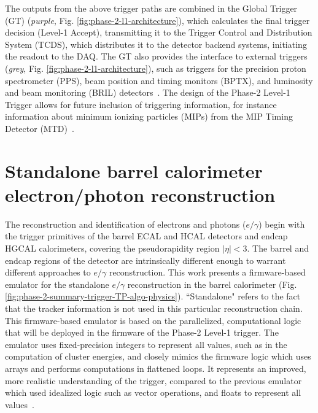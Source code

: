 The outputs from the above trigger paths are combined in the Global Trigger (GT) (\textit{purple}, Fig. \ref{fig:phase-2-l1-architecture}), which calculates the final trigger decision (Level-1 Accept), transmitting it to the Trigger Control and Distribution System (TCDS), which distributes it to the detector backend systems, initiating the readout to the DAQ. The GT also provides the interface to external triggers (\textit{grey}, Fig. \ref{fig:phase-2-l1-architecture}), such as triggers for the precision proton spectrometer (PPS), beam position and timing monitors (BPTX), and luminosity and beam monitoring (BRIL) detectors~\cite{CMS-TDR-021}. The design of the Phase-2 Level-1 Trigger allows for future inclusion of triggering information, for instance information about minimum ionizing particles (MIPs) from the MIP Timing Detector (MTD)~\cite{CERN-LHCC-2017-027}.

\section{Standalone barrel calorimeter electron/photon reconstruction}
\label{section:standalone_barrel_calo_egamma}
The reconstruction and identification of electrons and photons ($e/\gamma$) begin with the trigger primitives of the barrel ECAL and HCAL detectors and endcap HGCAL calorimeters, covering the pseudorapidity region $|\eta| < 3$. The barrel and endcap regions of the detector are intrinsically different enough to warrant different approaches to $e/\gamma$ reconstruction. This work presents a firmware-based emulator for the standalone $e/\gamma$ reconstruction in the barrel calorimeter (Fig. \ref{fig:phase-2-summary-trigger-TP-algo-physics}). ``Standalone" refers to the fact that the tracker information is not used in this particular reconstruction chain. This firmware-based emulator is based on the parallelized, computational logic that will be deployed in the firmware of the Phase-2 Level-1 trigger. The emulator uses fixed-precision integers to represent all values, such as in the computation of cluster energies, and closely mimics the firmware logic which uses arrays and performs computations in flattened loops. It represents an improved, more realistic understanding of the trigger, compared to the previous emulator which used idealized logic such as vector operations, and floats to represent all values~\cite{CMS-TDR-021}.


